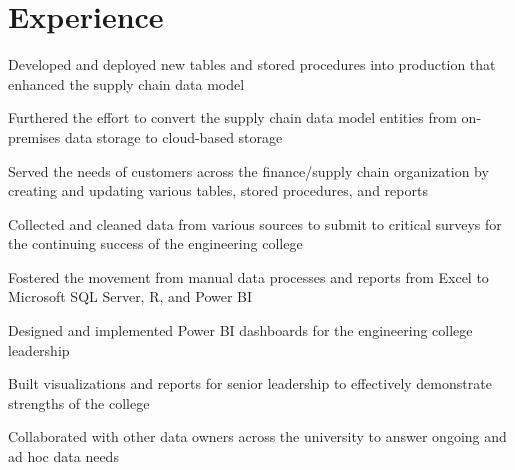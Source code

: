 \documentclass[]{plushcv}
\begin{document}
%
%



%
%

\begin{minipage}[t]{0.70\textwidth} 



\section{Experience}
\vspace{\topsep} %
\begin{tightemize}
\sectionsep
\item Developed and deployed new tables and stored procedures into production that enhanced the supply chain data model 
\item Furthered the effort to convert the supply chain data model entities from on-premises data storage to cloud-based storage
\item Served the needs of customers across the finance/supply chain organization by creating and updating various tables, stored procedures, and reports
\end{tightemize}
\sectionsep

\begin{tightemize}
\sectionsep
\item Collected and cleaned data from various sources to
submit to critical surveys for the continuing success of the
engineering college
\item Fostered the movement from manual data processes and
reports from Excel to Microsoft SQL Server, R, and Power
BI
\item Designed and implemented Power BI dashboards for the
engineering college leadership
\item Built visualizations and reports for senior leadership to
effectively demonstrate strengths of the college
\item Collaborated with other data owners across the university
to answer ongoing and ad hoc data needs
\end{tightemize}
\sectionsep


\end{minipage}
\end{document}
